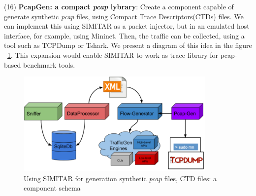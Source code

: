 (16) \textbf{PcapGen: a compact \textit{pcap} lybrary}: Create a component capable of generate synthetic \textit{pcap} files, using Compact Trace Descriptors(CTDs) files. We can implement this using SIMITAR as a packet injector, but in an emulated host interface, for example, using Mininet. Then, the traffic can be collected, using a tool such as TCPDump or Tshark. We present a diagram of this idea in the figure ~\ref{fig:pcap-gen}. This expansion would enable SIMITAR  to work as trace library for pcap-based benchmark tools.


\begin{figure}[!ht]
	\centering
	\includegraphics[height=2.0in]{figures/ch6/pcap-gen}
	\caption{Using SIMITAR for generation synthetic \textit{pcap} files, CTD files: a component schema}
	\label{fig:pcap-gen}
\end{figure}
	





